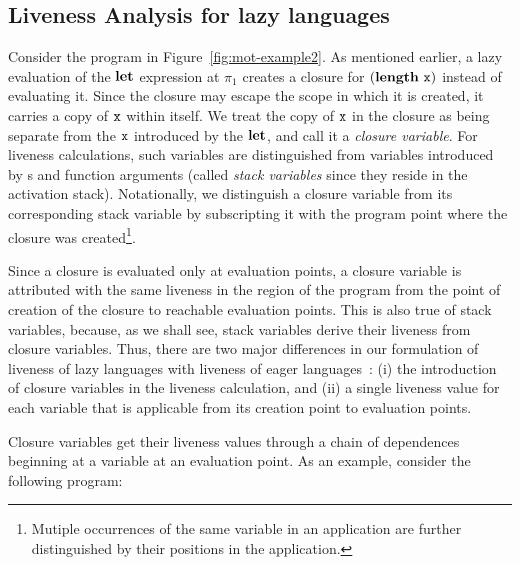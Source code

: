 \documentclass[preprint, 9pt]{sigplanconf}
\newcommand{\comment}[1]{{\color{Myblue}{#1}}}
\begin{document}


\subsection{Liveness Analysis for lazy languages}
\label{sec:liveness-analysis}
  
Consider the  program in Figure~\ref{fig:mot-example2}.   As mentioned
earlier, a lazy evaluation of the $\mbox{$\mathbf{ let}$}$ expression at $\pi_1$ creates
a closure  for $(\mathbf{length}~\mbox{\tt x})$  instead of  evaluating it.   Since the
closure may escape the scope in which it is created, it carries a copy
of $\mbox{\tt x}$ within itself.  We treat the  copy of $\mbox{\tt x}$ in the closure as
being separate from the $\mbox{\tt x}$ introduced  by the $\mbox{$\mathbf{ let}$}$, and call it a
\emph{closure  variable}.  For  liveness calculations,  such variables
are distinguished  from variables  introduced by  \LET s  and function
arguments  (called \emph{stack  variables}  since they  reside in  the
activation  stack). Notationally,  we distinguish  a closure  variable
from  its corresponding  stack variable  by subscripting  it with  the
program   point  where   the   closure  was   created\footnote{Mutiple
  occurrences  of the  same  variable in  an  application are  further
  distinguished by their positions in the application.}.


  Since a  closure is evaluated  only at evaluation points,  a closure
  variable is attributed  with the same liveness in the  region of the
  program  from the  point of  creation  of the  closure to  reachable
  evaluation points.  This  is also true of  stack variables, because,
  as we shall see, stack  variables derive their liveness from closure
  variables. Thus, there are two  major differences in our formulation
  of   liveness   of   lazy   languages   with   liveness   of   eager
  languages~\cite{asati14lgc}:   (i)  the   introduction  of   closure
  variables in  the liveness calculation,  and (ii) a  single liveness
  value for each  variable that is applicable from  its creation point
  to evaluation points.


  Closure  variables get  their  liveness values  through  a chain  of
  dependences beginning at  a variable at an evaluation  point.  As an
  example, consider the following program:


  
\end{document}
